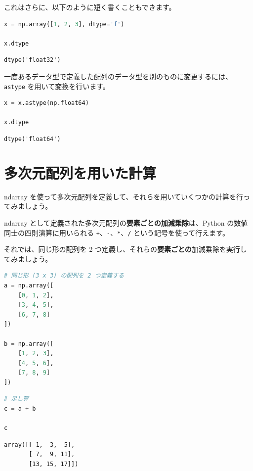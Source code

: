 これはさらに、以下のように短く書くこともできます。


\begin{lstlisting}[style=codecell,language=Python]
x = np.array([1, 2, 3], dtype='f')

x.dtype
\end{lstlisting}

\begin{lstlisting}[style=outputcell]
dtype('float32')
\end{lstlisting}

一度あるデータ型で定義した配列のデータ型を別のものに変更するには、\texttt{astype} を用いて変換を行います。


\begin{lstlisting}[style=codecell,language=Python]
x = x.astype(np.float64)

x.dtype
\end{lstlisting}

\begin{lstlisting}[style=outputcell]
dtype('float64')
\end{lstlisting}

\section{多次元配列を用いた計算}


ndarray を使って多次元配列を定義して、それらを用いていくつかの計算を行ってみましょう。


ndarray として定義された多次元配列の\textbf{要素ごとの加減乗除}は、Python の数値同士の四則演算に用いられる \texttt{+}、\texttt{-}、\texttt{*}、\texttt{/} という記号を使って行えます。


それでは、同じ形の配列を 2 つ定義し、それらの\textbf{要素ごとの}加減乗除を実行してみましょう。


\begin{lstlisting}[style=codecell,language=Python]
# 同じ形 (3 x 3) の配列を 2 つ定義する
a = np.array([
    [0, 1, 2],
    [3, 4, 5],
    [6, 7, 8]
])

b = np.array([
    [1, 2, 3],
    [4, 5, 6],
    [7, 8, 9]
])
\end{lstlisting}

\begin{lstlisting}[style=codecell,language=Python]
# 足し算
c = a + b

c
\end{lstlisting}

\begin{lstlisting}[style=outputcell]
array([[ 1,  3,  5],
       [ 7,  9, 11],
       [13, 15, 17]])
\end{lstlisting}

